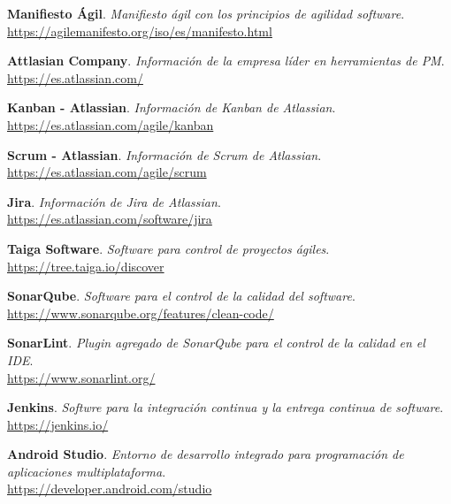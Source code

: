 \begin{thebibliography}{X}

\setlength{\columnsep}{1.5cm}
    \begin{multicols}{2}
    \textbf{Manifiesto Ágil}. \textit{Manifiesto ágil con los principios de agilidad software}. \\
    \small{\url{https://agilemanifesto.org/iso/es/manifesto.html}}
    
    \textbf{Attlasian Company}. \textit{Información de la empresa líder en herramientas de PM}. \\
    \small{\url{https://es.atlassian.com/}}
    
    \textbf{Kanban - Atlassian}. \textit{Información de Kanban de Atlassian}. \\
    \small{\url{https://es.atlassian.com/agile/kanban}}
    
    \textbf{Scrum - Atlassian}. \textit{Información de Scrum de Atlassian}. \\
    \small{\url{https://es.atlassian.com/agile/scrum}}
    
    \textbf{Jira}. \textit{Información de Jira de Atlassian}. \\
    \small{\url{https://es.atlassian.com/software/jira}}
    
    \textbf{Taiga Software}. \textit{Software para control de proyectos ágiles}. \\
    \small{\url{https://tree.taiga.io/discover}}
    
    \textbf{SonarQube}. \textit{Software para el control de la calidad del software}. \\
    \small{\url{https://www.sonarqube.org/features/clean-code/}}
    
    \textbf{SonarLint}. \textit{Plugin agregado de SonarQube para el control de la calidad en el IDE}. \\
    \small{\url{https://www.sonarlint.org/}}
    
    \textbf{Jenkins}. \textit{Softwre para la integración continua y la entrega continua de software}. \\
    \small{\url{https://jenkins.io/}}
    
    \textbf{Android Studio}. \textit{Entorno de desarrollo integrado para programación de aplicaciones multiplataforma}. \\
    \small{\url{https://developer.android.com/studio}}
    

\end{multicols}
\end{thebibliography}
